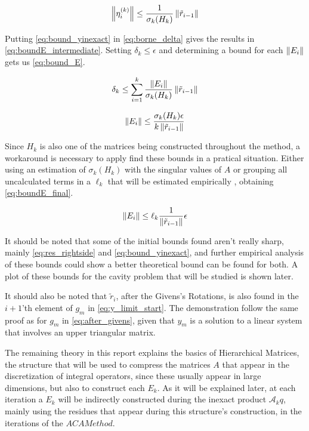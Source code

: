 \begin{equation}\label{eq:bound_yinexact}
    \left\lVert\eta_{i}^{(k)}\right\rVert \leq \frac{1}{\sigma_{k}(H_{k})} \left\lVert\tilde{r}_{i-1}\right\rVert
\end{equation}

Putting \ref{eq:bound_yinexact} in \ref{eq:borne_delta} gives the results in \ref{eq:boundE_intermediate}. Setting $\delta_{k} \leq \epsilon$ and determining a bound for each $\left\lVert E_{i}\right\rVert$ gets us \ref{eq:bound_E}.


\begin{equation}\label{eq:boundE_intermediate}
    \delta_{k} \leq \sum_{i=1}^{k} \frac{\left\lVert E_{i}\right\rVert}{\sigma_{k}(H_{k})}\left\lVert\tilde{r}_{i-1}\right\rVert
\end{equation}

\begin{equation}\label{eq:bound_E}
    \left\lVert E_{i}\right\rVert \leq \frac{\sigma_{k}(H_{k})\epsilon}{k\left\lVert\tilde{r}_{i-1}\right\rVert}
\end{equation}

Since $H_{k}$ is also one of the matrices being constructed throughout the method, a workaround is necessary to apply find these bounds in a pratical situation. Either using an estimation of $\sigma_{k}(H_{k})$ with the singular values of $A$ or grouping all uncalculated terms in a $\ell_{k}$ that will be estimated empirically \cite{simoncini2003theory}, obtaining \ref{eq:boundE_final}.

\begin{equation}\label{eq:boundE_final}
    \left\lVert E_{i}\right\rVert \leq \ell_{k} \frac{1}{\left\lVert\tilde{r}_{i-1}\right\rVert} \epsilon
\end{equation}

It should be noted \cite{simoncini2003theory} that some of the initial bounds found aren't really sharp, mainly \ref{eq:res_rightside} and \ref{eq:bound_yinexact}, and further empirical analysis of these bounds could show a better theoretical bound can be found for both. A plot of these bounds for the cavity problem that will be studied is shown later.

It should also be noted that $\tilde{r}_{i}$, after the Givens's  Rotations, is also found in the $i+1$'th element of $g_{m}$ in \ref{eq:y_limit_start}. The demonstration follow the same proof as for $g_{m}$ in \ref{eq:after_givens}, given that $y_{m}$ is a solution to a linear system that involves an upper triangular matrix.

The remaining theory in this report explains the basics of Hierarchical Matrices, the structure that will be used to compress the matrices $A$ that appear in the discretization of integral operators, since these usually appear in large dimensions, but also to construct each $E_{k}$. As it will be explained later, at each iteration a $E_{k}$ will be indirectly constructed during the inexact product $\mathcal{A}_{k}q$, mainly using the residues that appear during this structure's construction, in the iterations of the $ACA Method$.